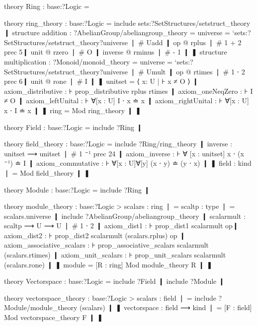 \begin{mmtcode}[caption={A Theory of Rings\protect\footnotemark},label={lst:lf:rec:mv1}]
theory Ring : base:?Logic =

  theory ring_theory : base:?Logic =
    include sets:?SetStructures/setstruct_theory ❙
    structure addition : ?AbelianGroup/abeliangroup_theory =
      universe = `sets:?SetStructures/setstruct_theory?universe ❘ # Uadd ❙
      op @ rplus ❘ # 1 + 2 prec 5❙
      unit @ rzero ❘ # O ❙
      inverse @ rminus ❘ # - 1 ❙
    ❚ 
    structure multiplication : ?Monoid/monoid_theory =
      universe = `sets:?SetStructures/setstruct_theory?universe ❘ # Umult ❙
      op  @ rtimes ❘ # 1 ⋅ 2 prec 6❙
      unit @ rone ❘ # I ❙
    ❚
    unitset = ⟨ x: U | ⊦ x ≠ O ⟩ ❙
    axiom_distributive : ⊦ prop_distributive rplus rtimes ❙
    axiom_oneNeqZero : ⊦ I ≠ O ❙
    axiom_leftUnital : ⊦ ∀[x : U] I ⋅ x ≐ x ❙
    axiom_rightUnital : ⊦ ∀[x : U] x ⋅ I ≐ x ❙
  ❚
  ring = Mod ring_theory ❙
❚
\end{mmtcode}
\begin{mmtcode}[caption={A Theory of Fields \protect\footnotemark},label={lst:lf:rec:mv2}]
theory Field : base:?Logic =
  include ?Ring ❙

  theory field_theory : base:?Logic =
    include ?Ring/ring_theory ❙		
    inverse : unitset ⟶ unitset ❘ # 1 ⁻¹  prec 24 ❙
    axiom_inverse : ⊦ ∀ [x : unitset] x ⋅ (x ⁻¹) ≐ I ❙
    axiom_commutative : ⊦ ∀[x : U]∀[y] (x ⋅ y) ≐ (y ⋅ x) ❙
  ❚
  field : kind ❘ = Mod field_theory ❙
❚
\end{mmtcode}
\begin{mmtcode}[caption={A Theory of Modules \protect\footnotemark},label={lst:lf:rec:mv3}]
theory Module : base:?Logic =
  include ?Ring ❙

  theory module_theory : base:?Logic > scalars : ring ❘ =
    scaltp : type ❘ = scalars.universe ❙
    include ?AbelianGroup/abeliangroup_theory ❙
    scalarmult : scaltp ⟶ U ⟶ U ❘ # 1 ⋅ 2 ❙
    axiom_dist1 : ⊦ prop_dist1 scalarmult op❙
    axiom_dist2 : ⊦ prop_dist2 scalarmult (scalars.rplus) op ❙
    axiom_associative_scalars : ⊦ prop_associative_scalars scalarmult (scalars.rtimes) ❙
    axiom_unit_scalars : ⊦ prop_unit_scalars scalarmult (scalars.rone) ❙
  ❚ 
  module = [R : ring] Mod module_theory R ❙
❚
\end{mmtcode}
\begin{mmtcode}[caption={A Theory of Vector Spaces \protect\footnotemark},label={lst:lf:rec:mv4}]
theory Vectorspace : base:?Logic =
  include ?Field ❙
  include ?Module ❙

  theory vectorspace_theory : base:?Logic > scalars : field ❘ =
    include ?Module/module_theory (scalars) ❙
  ❚ 
  vectorspace : field ⟶ kind ❘ = [F : field] Mod vectorspace_theory F ❙
❚
\end{mmtcode}
